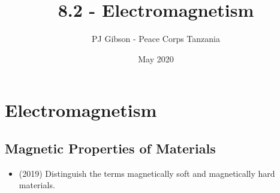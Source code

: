 \documentclass{article}
\title{8.2 - Electromagnetism}
\author{PJ Gibson - Peace Corps Tanzania}
\date{May 2020}
\begin{document}
\maketitle


\section{Electromagnetism}

\subsection{Magnetic Properties of Materials}
\begin{itemize}
\item (2019)  Distinguish the terms magnetically soft and magnetically hard materials.
\end{itemize}
\end{document}
